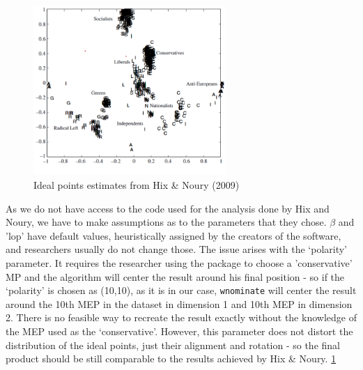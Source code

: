 \documentclass[a4paper,12pt]{report}
\begin{document}
                \begin{figure}[H]
                    \centering
                    \includegraphics[width=0.65\textwidth]{Graphs/Screenshot 2024-06-09 220607}
                    \caption{Ideal points estimates from Hix \& Noury (2009)}
                    \label{fig:WNOMINATEHIX6}
                \end{figure}


                As we do not have access to the code used for the analysis done by Hix and Noury, we have to make
                assumptions as
                to the parameters that they chose. \( \beta \)
                and 'lop' have default values, heuristically assigned by the
                creators of the software, and researchers usually do not change those. The issue arises with the
                `polarity'
                parameter. It requires the researcher using the package to choose a 'conservative' MP and the
                algorithm will
                center the result around his final position - so if the `polarity' is chosen as (10,10), as it
                is in our case, \texttt{wnominate}
                will center the result around the 10th MEP in the dataset in dimension 1 and 10th MEP in dimension 2.
                There is
                no feasible way to recreate the result exactly without the knowledge of the MEP used as the
                `conservative'.
                However, this parameter does not distort the distribution of the ideal points, just their alignment and
                rotation
                - so the final product should be still comparable to the results achieved by Hix \& Noury.
                \ref{fig:WNOMINATEHIX6}
\end{document}
